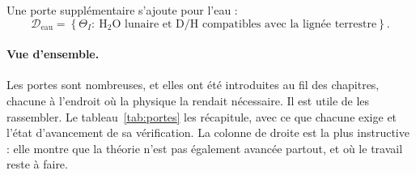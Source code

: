 \documentclass[11pt,a4paper,openany]{report}
\begin{document}
Une porte supplémentaire s'ajoute pour l'eau :
\begin{equation}
\mathcal{D}_{\mathrm{eau}}=\left\{\Theta_I:\ \text{H}_2\text{O lunaire et D/H compatibles avec la lignée terrestre}\right\}.
\label{eq:Deau}
\end{equation}


\paragraph{Vue d'ensemble.} Les portes sont nombreuses, et elles ont été introduites au fil des
chapitres, chacune à l'endroit où la physique la rendait nécessaire. Il est utile de les
rassembler. Le tableau~\ref{tab:portes} les récapitule, avec ce que chacune exige et l'état
d'avancement de sa vérification. La colonne de droite est la plus instructive : elle montre que la
théorie n'est pas également avancée partout, et où le travail reste à faire.
\end{document}
